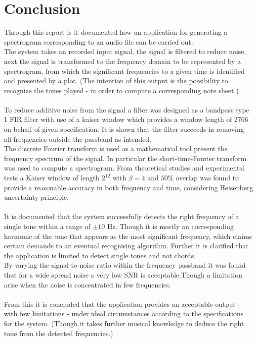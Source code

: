 \chapter{Conclusion}
Through this report is it documented how an application for generating a spectrogram corresponding to an audio file can be carried out.\\
The system takes an recorded input signal,  the signal is filtered to reduce noise, next the signal is transformed to the frequency domain to be represented by a spectrogram, from which the significant frequencies to a given time is identified and presented by a plot. (The intention of this output is the possibility to recognize the tones played - in order to compute a corresponding note sheet.)\\
\\
To reduce additive noise from the signal a  filter was designed as a bandpass type 1 FIR filter with use of a kaiser window which provides a window length of 2766 on behalf of given specification. It is shown that the filter succeeds in removing all frequencies outside the passband as intended.\\
The discrete Fourier transform is used as a mathematical tool present the frequency spectrum of the signal. In particular the short-time-Fourier transform was used to compute a spectrogram. From theoretical studies and experimental tests a Kaiser window of length $2^{12}$ with $\beta = 4$ and $50\%$ overlap was found to provide a reasonable accuracy in both frequency and time, considering Heisenberg uncertainty principle.\\
\\
It is documented that the system successfully detects the right frequency of a single tone within a range of $\pm 10$ Hz. Though it is mostly an corresponding harmonic of the tone that appears as the most significant frequency, which claims  certain demands to an eventual recognising algorithm. Further it is clarified that the application is limited to detect single tones and not chords. \\
By varying the signal-to-noise ratio within the frequency  passband it was found that for a wide spread noise a very low SNR is acceptable.Though a limitation arise when the noise is concentrated in few frequencies. \\ 
 \\
From this it is concluded that the application provides an acceptable output - with few limitations - under ideal circumstances according to the specifications for the system. (Though it takes further musical knowledge to deduce the right tone from the detected frequencies.)
